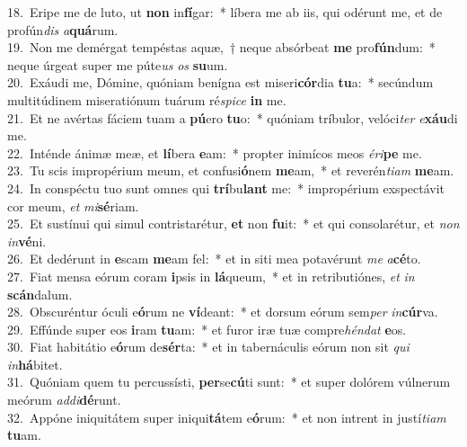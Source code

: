 {18.~}Eripe me de luto, ut \textbf{non} in\textbf{fí}gar:~* líbera me ab iis, qui odérunt me, et de profún\textit{dis} \textit{a}\textbf{quá}rum.\\
{19.~}Non me demérgat tempéstas aquæ,~† neque absórbeat \textbf{me} pro\textbf{fún}dum:~* neque úrgeat super me púte\textit{us} \textit{os} \textbf{su}um.\\
{20.~}Exáudi me, Dómine, quóniam benígna est miseri\textbf{cór}dia \textbf{tu}a:~* secúndum multitúdinem miseratiónum tuárum ré\textit{spi}\textit{ce} \textbf{in} me.\\
{21.~}Et ne avértas fáciem tuam a \textbf{pú}ero \textbf{tu}o:~* quóniam tríbulor, velóci\textit{ter} \textit{e}\textbf{xáu}di me.\\
{22.~}Inténde ánimæ meæ, et \textbf{lí}bera \textbf{e}am:~* propter inimícos meos \textit{é}\textit{ri}\textbf{pe} me.\\
{23.~}Tu scis impropérium meum, et confusi\textbf{ó}nem \textbf{me}am,~* et reverén\textit{ti}\textit{am} \textbf{me}am.\\
{24.~}In conspéctu tuo sunt omnes qui \textbf{trí}bu\textbf{lant} me:~* impropérium exspectávit cor meum, \textit{et} \textit{mi}\textbf{sé}riam.\\
{25.~}Et sustínui qui simul contristarétur, \textbf{et} non \textbf{fu}it:~* et qui consolarétur, et \textit{non} \textit{in}\textbf{vé}ni.\\
{26.~}Et dedérunt in \textbf{e}scam \textbf{me}am fel:~* et in siti mea potavérunt \textit{me} \textit{a}\textbf{cé}to.\\
{27.~}Fiat mensa eórum coram \textbf{i}psis in \textbf{lá}queum,~* et in retributiónes, \textit{et} \textit{in} \textbf{scán}dalum.\\
{28.~}Obscuréntur óculi e\textbf{ó}rum ne \textbf{ví}deant:~* et dorsum eórum sem\textit{per} \textit{in}\textbf{cúr}va.\\
{29.~}Effúnde super eos \textbf{i}ram \textbf{tu}am:~* et furor iræ tuæ compre\textit{hén}\textit{dat} \textbf{e}os.\\
{30.~}Fiat habitátio e\textbf{ó}rum de\textbf{sér}ta:~* et in tabernáculis eórum non sit \textit{qui} \textit{in}\textbf{há}bitet.\\
{31.~}Quóniam quem tu percussísti, \textbf{per}se\textbf{cú}ti sunt:~* et super dolórem vúlnerum meórum \textit{ad}\textit{di}\textbf{dé}runt.\\
{32.~}Appóne iniquitátem super iniqui\textbf{tá}tem e\textbf{ó}rum:~* et non intrent in justí\textit{ti}\textit{am} \textbf{tu}am.\\
